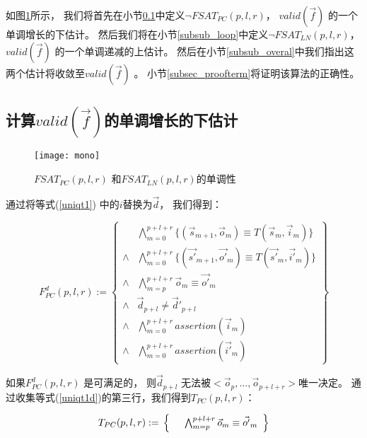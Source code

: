 

如图\ref{fig_mono_chap3}所示，
我们将首先在小节\ref{subsub_nonloop}中定义$\neg FSAT_{PC}(p,l,r)$，
$valid(\vec{f})$ 的一个单调增长的下估计。
然后我们将在小节\ref{subsub_loop}中定义$\neg FSAT_{LN}(p,l,r)$，
$valid(\vec{f})$ 的一个单调递减的上估计。
然后在小节\ref{subsub_overal}中我们指出这两个估计将收敛至$valid(\vec{f})$ 。
小节\ref{subsec_proofterm}将证明该算法的正确性。


\subsection{计算$valid(\vec{f})$的单调增长的下估计}\label{subsub_nonloop}

\begin{figure}[t]
\begin{center}
\texttt{[image: mono]}
\end{center}
\caption{$FSAT_{PC}(p,l,r)$ 和$FSAT_{LN}(p,l,r)$的单调性}
  \label{fig_mono_chap3}
\end{figure}

通过将等式(\ref{uniqt1}) 中的$i$替换为$\vec{d}$，
我们得到：

\begin{equation}\label{uniqt1d}
F^d_{PC}(p,l,r):=
\left\{
\begin{array}{cc}
&\bigwedge_{m=0}^{p+l+r}
\{
(\vec{s}_{m+1},\vec{o}_m)\equiv T(\vec{s}_m,\vec{i}_m)
\}
\\
\wedge&\bigwedge_{m=0}^{p+l+r}
\{
(\vec{s'}_{m+1},\vec{o'}_m)\equiv T(\vec{s'}_m,\vec{i'}_m)
\}
\\
\wedge&\bigwedge_{m=p}^{p+l+r}\vec{o}_m\equiv \vec{o'}_m \\
\wedge& \vec{d}_{p+l}\ne \vec{d}'_{p+l} \\
\wedge&\bigwedge_{m=0}^{p+l+r}assertion(\vec{i}_m) \\
\wedge&\bigwedge_{m=0}^{p+l+r}assertion(\vec{i'}_m)
\end{array}
\right\}
\end{equation}

如果$F^d_{PC}(p,l,r)$ 是可满足的，
则$\vec{d}_{p+l}$ 无法被$<\vec{o}_p,\dots,\vec{o}_{p+l+r}>$唯一决定。
通过收集等式(\ref{uniqt1d})的第三行，我们得到$T_{PC}(p,l,r)$：

\begin{equation}\label{tpc}
T_{PC}(p,l,r):=\\
\left\{
\begin{array}{cc}
      &\bigwedge_{m=p}^{p+l+r}\vec{o}_m\equiv \vec{o'}_m \\
\end{array}
\right\}
\end{equation}


